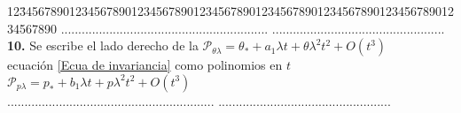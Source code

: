 \begin{center}


\begin{tabbing}
12\=34567890123456789012345678901234567890123456\=7890123456789012345678901234567890\kill%
\>............................................................  \>..................................................\\
\>\textbf{10.} Se escribe el lado derecho de la \> $\mathcal{P}_{\theta\lambda} = \theta_{*}+a_{1}\lambda t +\theta\lambda^{2}t^{2}+O(t^{3}) $\\
\>ecuación \eqref{Ecua de invariancia} como polinomios en $t$ \>$ \mathcal{P}_{p\lambda} = p_{*}+b_{1}\lambda t +p\lambda^{2}t^{2}+O(t^{3}) $\\ 
\>............................................................  \>..................................................\\
\end{tabbing}
\end{center}

